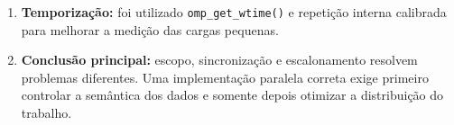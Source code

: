 \begin{enumerate}
    \item \textbf{Temporização:}
    foi utilizado \texttt{omp\_get\_wtime()} e repetição interna calibrada
    para melhorar a medição das cargas pequenas.

    \item \textbf{Conclusão principal:}
    escopo, sincronização e escalonamento resolvem problemas diferentes.
    Uma implementação paralela correta exige primeiro controlar a semântica
    dos dados e somente depois otimizar a distribuição do trabalho.

\end{enumerate}
